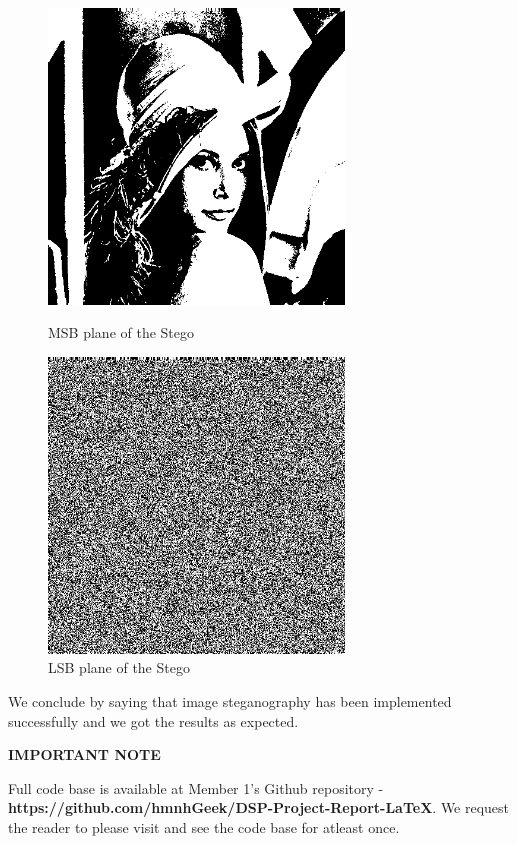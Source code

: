 \documentclass{report}
\begin{document}
\begin{figure}[H]
\centering
\begin{minipage}{0.46\linewidth}
\centering
\includegraphics[width=0.7\textwidth]{images/stegomsb.png}
\caption{MSB plane of the Stego}
\end{minipage}
\hfill
\begin{minipage}{0.46\linewidth}
\centering
\includegraphics[width=0.7\textwidth]{images/stegolsb.png}
\caption{LSB plane of the Stego}
\end{minipage}
\end{figure}
We conclude by saying that image steganography has been implemented successfully and we got the results as expected.
\\
\par \begin{center} \textbf{IMPORTANT NOTE} \end{center}
\par Full code base is available at Member 1's Github repository - {\bf https://github.com/hmnhGeek/DSP-Project-Report-LaTeX}. We request the reader to please visit and see the code base for atleast once.

\begin{center}
\decosix\decosix\decosix
\end{center}
\end{document}
